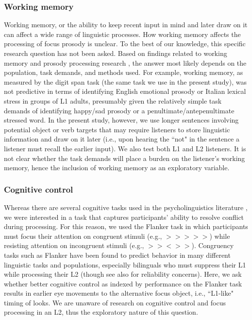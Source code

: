 \subsubsection{Working memory}
Working memory, or the ability to keep recent input in mind and later draw on it \citep[see][]{baddeley2003working,carpenter2013role} can affect a wide range of linguistic processes. How working memory affects the processing of focus prosody is unclear. To the best of our knowledge, this specific research question has not been asked. Based on findings related to working memory and prosody processing research \citep[e.g.,][]{traxler2009hierarchical,ferreira2015prosody, bishop2021exploring}, the answer most likely depends on the population, task demands, and methods used. For example, working memory, as measured by the digit span task (the same task we use in the present study), was not predictive in terms of identifying English emotional prosody \citep{sinagra2022perception} or Italian lexical stress \citep{ppcc} in groups of L1 adults, presumably given the relatively simple task demands of identifying happy/sad prosody or a penultimate/antepenultimate stressed word. In the present study, however, we use longer sentences involving potential object or verb targets that may require listeners to store linguistic information and draw on it later (i.e., upon hearing the ``not" in the sentence a listener must recall the earlier input). We also test both L1 and L2 listeners. It is not clear whether the task demands will place a burden on the listener's working memory, hence the inclusion of working memory as an exploratory variable.


\subsubsection{Cognitive control}
Whereas there are several cognitive tasks used in the psycholinguistics literature \citep{ness2023state}, we were interested in a task that captures participants' ability to resolve conflict during processing. For this reason, we used the Flanker task \citep{eriksen1974effects} in which 
participants must focus their attention on congruent stimuli (e.g., $>>>>>$) while resisting attention on incongruent stimuli (e.g., $>><>>$). Congruency tasks such as Flanker have been found to predict behavior in many different linguistic tasks and populations, especially bilinguals who must suppress their L1 while processing their L2 \citep{blumenfeld2014cognitive,luk2011there} (though see also \cite{hedge2018reliability} for reliability concerns). Here, we ask whether better cognitive control as indexed by performance on the Flanker task results in earlier eye movements to the alternative focus object, i.e., ``L1-like" timing of looks. We are unaware of research on cognitive control and focus processing in an L2, thus the exploratory nature of this question.



